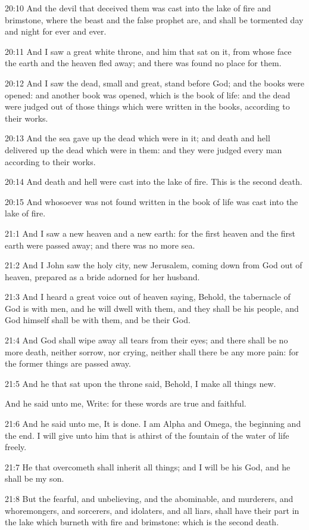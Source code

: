 20:10 And the devil that deceived them was cast into the lake of fire
and brimstone, where the beast and the false prophet are, and shall be
tormented day and night for ever and ever.

20:11 And I saw a great white throne, and him that sat on it, from
whose face the earth and the heaven fled away; and there was found no
place for them.

20:12 And I saw the dead, small and great, stand before God; and the
books were opened: and another book was opened, which is the book of
life: and the dead were judged out of those things which were written
in the books, according to their works.

20:13 And the sea gave up the dead which were in it; and death and
hell delivered up the dead which were in them: and they were judged
every man according to their works.

20:14 And death and hell were cast into the lake of fire. This is the
second death.

20:15 And whosoever was not found written in the book of life was cast
into the lake of fire.

21:1 And I saw a new heaven and a new earth: for the first heaven and
the first earth were passed away; and there was no more sea.

21:2 And I John saw the holy city, new Jerusalem, coming down from God
out of heaven, prepared as a bride adorned for her husband.

21:3 And I heard a great voice out of heaven saying, Behold, the
tabernacle of God is with men, and he will dwell with them, and they
shall be his people, and God himself shall be with them, and be their
God.

21:4 And God shall wipe away all tears from their eyes; and there
shall be no more death, neither sorrow, nor crying, neither shall
there be any more pain: for the former things are passed away.

21:5 And he that sat upon the throne said, Behold, I make all things
new.

And he said unto me, Write: for these words are true and faithful.

21:6 And he said unto me, It is done. I am Alpha and Omega, the
beginning and the end. I will give unto him that is athirst of the
fountain of the water of life freely.

21:7 He that overcometh shall inherit all things; and I will be his
God, and he shall be my son.

21:8 But the fearful, and unbelieving, and the abominable, and
murderers, and whoremongers, and sorcerers, and idolaters, and all
liars, shall have their part in the lake which burneth with fire and
brimstone: which is the second death.

